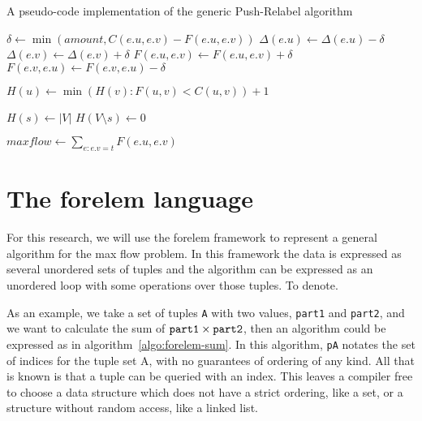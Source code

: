 \begin{algorithm}
\caption{A pseudo-code implementation of the generic Push-Relabel algorithm}
\label{algo:push-relabel}

\begin{algorithmic}
	\State $\delta \gets \min(amount, C(e.u, e.v) - F(e.u, e.v))$
	\State $\Delta(e.u) \gets \Delta(e.u) - \delta$
	\State $\Delta(e.v) \gets \Delta(e.v) + \delta$
	\State $F(e.u, e.v) \gets F(e.u, e.v) + \delta$
	\State $F(e.v, e.u) \gets F(e.v, e.u) - \delta$
\EndFunction

\State

	\State $H(u) \gets \min(H(v) : F(u, v) < C(u, v)) + 1$
\EndFunction

\State

	\State {}
\EndFor

\State

\State $H(s) \gets |V|$
\State $H(V \setminus s) \gets 0$

\State

		\State {}
	\Else
		\State {}
	\EndIf
\EndWhile

\State

\State $maxflow \gets \sum\limits_{e : e.v = t} F(e.u, e.v)$
\end{algorithmic}
\end{algorithm}

\section{The forelem language}

For this research, we will use the forelem framework \cite{Rietveld} to represent a general algorithm for the max flow problem. In this framework the data is expressed as several unordered sets of tuples and the algorithm can be expressed as an unordered loop with some operations over those tuples. To denote.

As an example, we take a set of tuples \texttt{A} with two values, \texttt{part1} and \texttt{part2}, and we want to calculate the sum of $\text{\texttt{part1}} \times \text{\texttt{part2}}$, then an algorithm could be expressed as in algorithm~\ref{algo:forelem-sum}. In this algorithm, \texttt{pA} notates the set of indices for the tuple set A, with no guarantees of ordering of any kind. All that is known is that a tuple can be queried with an index. This leaves a compiler free to choose a data structure which does not have a strict ordering, like a set, or a structure without random access, like a linked list.

